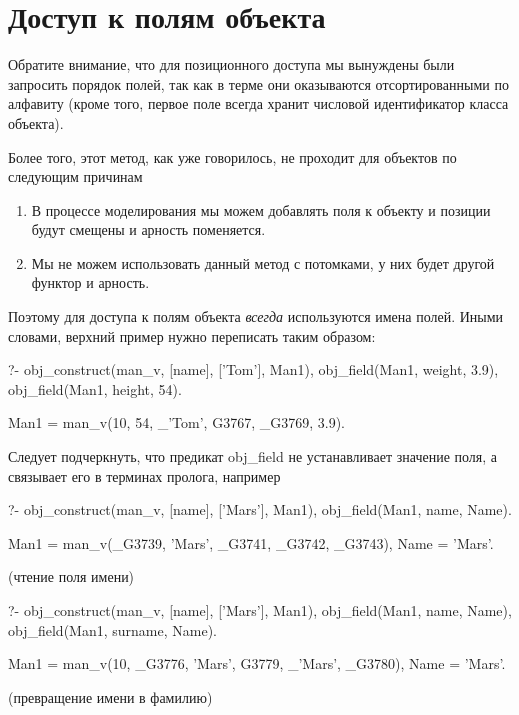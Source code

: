 \documentclass[a4paper]{book}
\begin{document}

\section{Доступ к полям объекта}

Обратите внимание, что для позиционного доступа мы вынуждены были запросить
порядок полей, так как в терме они оказываются отсортированными по алфавиту
(кроме того, первое поле всегда хранит числовой идентификатор класса объекта).

Более того, этот метод, как уже говорилось, не проходит для объектов
по следующим причинам

\begin{enumerate}
\item В процессе моделирования мы можем добавлять поля к объекту и
позиции будут смещены и арность поменяется.
\item Мы не можем использовать данный метод с потомками, у них будет
другой функтор и арность.
\end{enumerate}

Поэтому для доступа к полям объекта {\it всегда\/} используются
имена полей. Иными словами, верхний пример нужно переписать таким
образом:

\begin{example}{}{}
?- obj_construct(man_v, [name], ['Tom'], Man1), 
   obj_field(Man1, weight, 3.9), 
   obj_field(Man1, height, 54).

Man1 = man_v(10, 54, _'Tom', G3767, _G3769, 3.9).
\end{example}

Следует подчеркнуть, что предикат obj_field не устанавливает
значение поля, а связывает его в терминах пролога, например

\begin{example}{}{}
?- obj_construct(man_v, [name], ['Mars'], Man1), 
   obj_field(Man1, name, Name).

Man1 = man_v(_G3739, 'Mars', _G3741, _G3742, _G3743),
Name = 'Mars'.
\end{example}
(чтение поля имени)

\begin{example}{}{}
?- obj_construct(man_v, [name], ['Mars'], Man1), 
   obj_field(Man1, name, Name), 
   obj_field(Man1, surname, Name).

Man1 = man_v(10, _G3776, 'Mars', G3779, _'Mars', _G3780),
Name = 'Mars'.
\end{example}
(превращение имени в фамилию)
\end{document}
